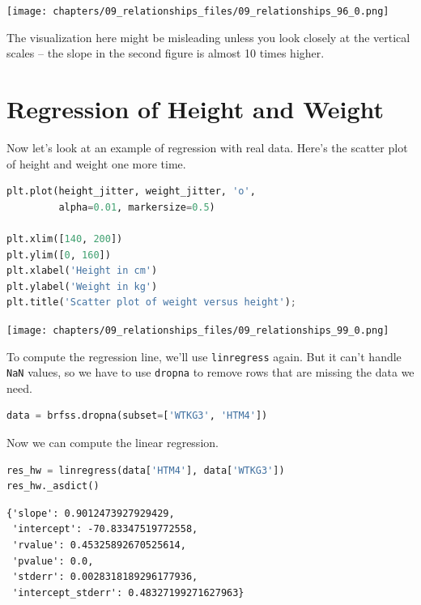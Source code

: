 \begin{center}
\texttt{[image: chapters/09\_relationships\_files/09\_relationships\_96\_0.png]}
\end{center}

The visualization here might be misleading unless you look closely at
the vertical scales -- the slope in the second figure is almost 10 times
higher.

\hypertarget{regression-of-height-and-weight}{%
\section{Regression of Height and
Weight}\label{regression-of-height-and-weight}}

Now let's look at an example of regression with real data. Here's the
scatter plot of height and weight one more time.

\begin{lstlisting}[language=Python,style=source]
plt.plot(height_jitter, weight_jitter, 'o', 
         alpha=0.01, markersize=0.5)

plt.xlim([140, 200])
plt.ylim([0, 160])
plt.xlabel('Height in cm')
plt.ylabel('Weight in kg')
plt.title('Scatter plot of weight versus height');
\end{lstlisting}

\begin{center}
\texttt{[image: chapters/09\_relationships\_files/09\_relationships\_99\_0.png]}
\end{center}

To compute the regression line, we'll use
\passthrough{\lstinline!linregress!} again. But it can't handle
\passthrough{\lstinline!NaN!} values, so we have to use
\passthrough{\lstinline!dropna!} to remove rows that are missing the
data we need.

\begin{lstlisting}[language=Python,style=source]
data = brfss.dropna(subset=['WTKG3', 'HTM4'])
\end{lstlisting}

Now we can compute the linear regression.

\begin{lstlisting}[language=Python,style=source]
res_hw = linregress(data['HTM4'], data['WTKG3'])
res_hw._asdict()
\end{lstlisting}

\begin{lstlisting}[style=output]
{'slope': 0.9012473927929429,
 'intercept': -70.83347519772558,
 'rvalue': 0.45325892670525614,
 'pvalue': 0.0,
 'stderr': 0.0028318189296177936,
 'intercept_stderr': 0.48327199271627963}
\end{lstlisting}

